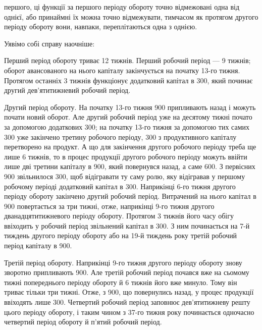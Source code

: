 \parcont{}  %
першого, ці функції за першого періоду обороту точно відмежовані одна
від однієї, або принаймні їх можна точно відмежувати, тимчасом як протягом
другого періоду обороту вони, навпаки, переплітаються одна з
однією.

Уявімо собі справу наочніше:

Перший період обороту триває 12 тижнів. Перший робочий період —
9 тижнів; оборот авансованого на нього капіталу закінчується на початку
13-го тижня. Протягом останніх 3 тижнів функціонує додатковий капітал
в 300, який починає другий дев’ятитижневий робочий
період.

Другий період обороту. На початку 13-го тижня 900 припливають
назад і можуть почати новий оборот. Але другий робочий
період уже на десятому тижні почато за допомогою додаткових 300; на початку 13-го тижня за допомогою тих самих 300
уже закінчено третину робочого періоду, 300 з продуктивного
капіталу перетворено на продукт. А що для закінчення другого робочого
періоду треба ще лише 6 тижнів, то в процес продукції другого робочого
періоду можуть ввійти лише дві третини капіталу в 900,
який повернувся назад, а саме 600. З первісних 900
звільнилося 300, щоб відігравати ту саму ролю, яку відігравав
у першому робочому періоді додатковий капітал в 300. Наприкінці
6-го тижня другого періоду обороту закінчено другий робочий
період. Витрачений на нього капітал в 900 повертається за три
тижні, отже, наприкінці 9-го тижня другого дванадцятитижневого періоду
обороту. Протягом 3 тижнів його часу обігу ввіходить у робочий період
звільнений капітал в 300. З ним починається на 7-й тиждень
другого періоду обороту або на 19-й тиждень року третій робочий
період капіталу в 900.

Третій період обороту. Наприкінці 9-го тижня другого періоду обороту
знову зворотно припливають 900. Але третій робочий
період почався вже на сьомому тижні попереднього періоду обороту й
6 тижнів його вже минуло. Тому він триває тільки три тижні. Отже,
з 900, що повернулись назад, у процес продукції ввіходять
лише 300. Четвертий робочий період заповнює дев’ятитижневу
решту цього періоду обороту, і таким чином з 37-го тижня року починається
одночасно четвертий період обороту й п’ятий робочий період.


